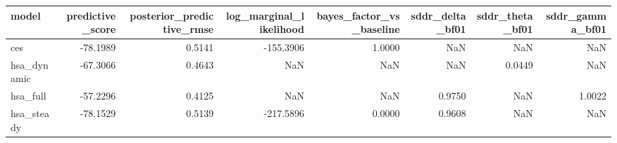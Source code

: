 \begin{tabular}{lrrrrrrr}
\toprule
model & predictive\_score & posterior\_predictive\_rmse & log\_marginal\_likelihood & bayes\_factor\_vs\_baseline & sddr\_delta\_bf01 & sddr\_theta\_bf01 & sddr\_gamma\_bf01 \\
\midrule
ces & -78.1989 & 0.5141 & -155.3906 & 1.0000 & NaN & NaN & NaN \\
hsa\_dynamic & -67.3066 & 0.4643 & NaN & NaN & NaN & 0.0449 & NaN \\
hsa\_full & -57.2296 & 0.4125 & NaN & NaN & 0.9750 & NaN & 1.0022 \\
hsa\_steady & -78.1529 & 0.5139 & -217.5896 & 0.0000 & 0.9608 & NaN & NaN \\
\bottomrule
\end{tabular}
